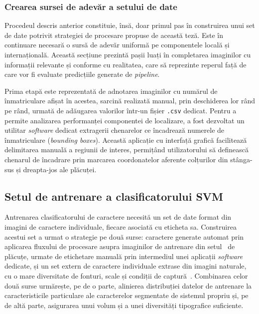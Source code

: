 \subsubsection{Crearea sursei de adevăr a setului de date}
\indent\par
Procedeul descris anterior constituie, însă, doar primul pas în construirea unui set de date potrivit strategiei de procesare propuse de această teză. Este în continuare necesară o sursă de adevăr uniformă pe componentele locală și internațională. Această secțiune prezintă pașii luați în completarea imaginilor cu informații relevante și conforme cu realitatea, care să reprezinte reperul față de care vor fi evaluate predicțiile generate de \textit{pipeline}.

Prima etapă este reprezentată de adnotarea imaginilor cu numărul de înmatriculare afișat în acestea, sarcină realizată manual, prin deschiderea lor rând pe rând, urmată de adăugarea valorilor într-un fișier \texttt{.csv} dedicat. Pentru a permite analizarea performanței componentei de localizare, a fost dezvoltat un utilitar \textit{software} dedicat extragerii chenarelor ce încadrează numerele de înmatriculare (\textit{bounding boxes}). Această aplicație cu interfață grafică facilitează delimitarea manuală a regiunii de interes, permițând utilizatorului să definească chenarul de încadrare prin marcarea coordonatelor aferente colțurilor din stânga-sus și dreapta-jos ale plăcuței.

\subsection{Setul de antrenare a clasificatorului SVM}
\indent\par
Antrenarea clasificatorului de caractere necesită un set de date format din imagini de caractere individuale, fiecare asociată cu eticheta sa. Construirea acestui set a urmat o strategie pe două surse: caractere generate automat prin aplicarea fluxului de procesare asupra imaginilor de antrenare din setul~\cite{roboflow-lp-dataset} de plăcuțe, urmate de etichetare manuală prin intermediul unei aplicații \textit{software} dedicate, și un set extern de caractere individuale extrase din imagini naturale, cu o mare diversitate de fonturi, scale și condiții de captură~\cite{deCampos09}. Combinarea celor două surse urmărește, pe de o parte, alinierea distribuției datelor de antrenare la caracteristicile particulare ale caracterelor segmentate de sistemul propriu și, pe de altă parte, asigurarea unui volum și a unei diversități tipografice suficiente.

